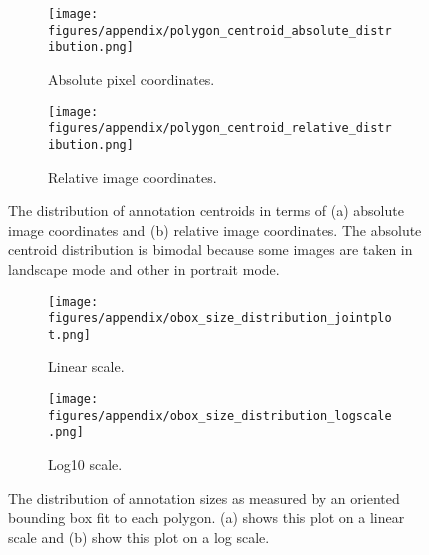 \begin{figure}[ht]
\centering
\begin{subfigure}[b]{0.4\textwidth}
 \texttt{[image: figures/appendix/polygon\_centroid\_absolute\_distribution.png]}
 \caption{Absolute pixel coordinates.}
 \label{fig:centroid_abs}
\end{subfigure}
\hfill
\begin{subfigure}[b]{0.4\textwidth}
 \texttt{[image: figures/appendix/polygon\_centroid\_relative\_distribution.png]}
 \caption{Relative image coordinates.}
 \label{fig:centroid_rel}
\end{subfigure}
\caption{The distribution of annotation centroids in terms of (a) absolute image coordinates and (b) relative image coordinates. The absolute centroid distribution is bimodal because some images are taken in landscape mode and other in portrait mode.}
\label{fig:centroid_location_distri}
\end{figure}





\begin{figure}[ht]
\centering
\begin{subfigure}[b]{0.4\textwidth}
  \texttt{[image: figures/appendix/obox\_size\_distribution\_jointplot.png]}
  \caption{Linear scale.}
  \label{fig:annot_obox_size_dist_linear}
\end{subfigure}
\hfill
\begin{subfigure}[b]{0.4\textwidth}
  \texttt{[image: figures/appendix/obox\_size\_distribution\_logscale.png]}
  \caption{Log10 scale.}
  \label{fig:annot_obox_size_dist_log}
\end{subfigure}
\caption{The distribution of annotation sizes as measured by an oriented bounding box fit to each polygon. (a) shows this plot on a linear scale and (b) show this plot on a log scale.}
\label{fig:annot_obox_size_dist}
\end{figure}


